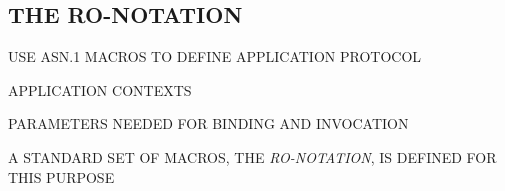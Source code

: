 \begin{bwslide}
\part	{THE RO-NOTATION}\bf

\begin{nrtc}
\item	USE ASN.1 MACROS TO DEFINE APPLICATION PROTOCOL
    \begin{nrtc}
    \item	APPLICATION CONTEXTS

    \item	PARAMETERS NEEDED FOR BINDING AND INVOCATION
    \end{nrtc}

\item	A STANDARD SET OF MACROS, THE \emph{RO-NOTATION},
	IS DEFINED FOR THIS PURPOSE
\end{nrtc}
\end{bwslide}




\begin{bwslide}
\begin{tgrind}
\let\linebox=\relax
\def\_{\ifstring{\char'137}\else\underline{\ }\fi}
\relax
\end{tgrind}
\end{bwslide}


\begin{bwslide}
\begin{tgrind}
\let\linebox=\relax
\def\_{\ifstring{\char'137}\else\underline{\ }\fi}
\relax
\end{tgrind}
\end{bwslide}


\begin{bwslide}
\begin{tgrind}
\let\linebox=\relax
\def\_{\ifstring{\char'137}\else\underline{\ }\fi}
\relax
\end{tgrind}
\end{bwslide}


\begin{bwslide}
\begin{tgrind}\scriptsize
\let\linebox=\relax
\def\_{\ifstring{\char'137}\else\underline{\ }\fi}
\relax
\end{tgrind}
\end{bwslide}


